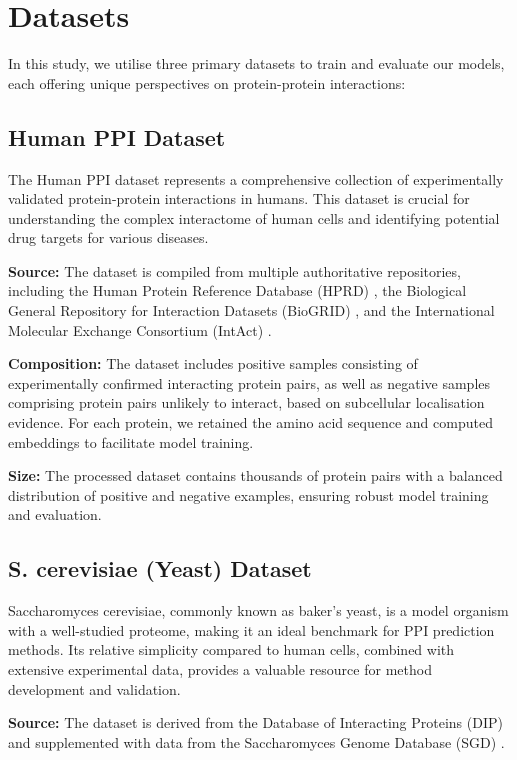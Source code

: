 \documentclass[12pt,a4paper]{article}
\begin{document}
\section{Datasets}
\label{sec:datasets}

In this study, we utilise three primary datasets to train and evaluate our models, each offering unique perspectives on protein-protein interactions:

\subsection{Human PPI Dataset}

The Human PPI dataset represents a comprehensive collection of experimentally validated protein-protein interactions in humans. This dataset is crucial for understanding the complex interactome of human cells and identifying potential drug targets for various diseases.

\textbf{Source:} The dataset is compiled from multiple authoritative repositories, including the Human Protein Reference Database (HPRD) \cite{keshava2009human}, the Biological General Repository for Interaction Datasets (BioGRID) \cite{stark2006biogrid}, and the International Molecular Exchange Consortium (IntAct) \cite{orchard2014mintact}.

\textbf{Composition:} The dataset includes positive samples consisting of experimentally confirmed interacting protein pairs, as well as negative samples comprising protein pairs unlikely to interact, based on subcellular localisation evidence. For each protein, we retained the amino acid sequence and computed embeddings to facilitate model training.

\textbf{Size:} The processed dataset contains thousands of protein pairs with a balanced distribution of positive and negative examples, ensuring robust model training and evaluation.

\subsection{S. cerevisiae (Yeast) Dataset}

Saccharomyces cerevisiae, commonly known as baker's yeast, is a model organism with a well-studied proteome, making it an ideal benchmark for PPI prediction methods. Its relative simplicity compared to human cells, combined with extensive experimental data, provides a valuable resource for method development and validation.

\textbf{Source:} The dataset is derived from the Database of Interacting Proteins (DIP) \cite{salwinski2004database} and supplemented with data from the Saccharomyces Genome Database (SGD) \cite{cherry2012saccharomyces}.
\end{document}
